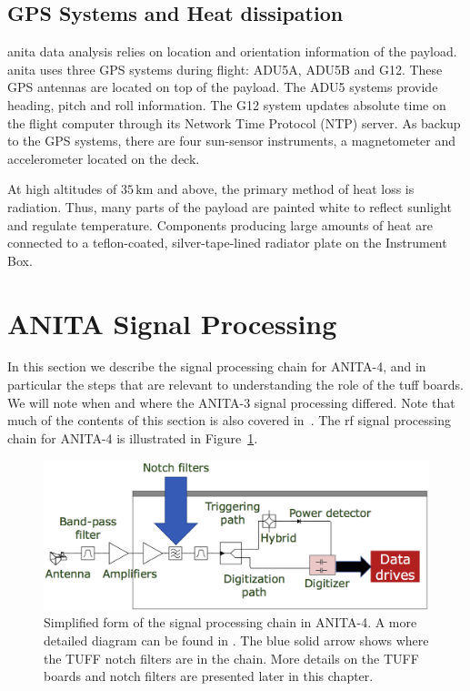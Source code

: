 \subsection{GPS Systems and Heat dissipation} 
\label{gps_heat}

\gls{anita} data analysis relies on location and orientation information of the payload. 
\gls{anita} uses three GPS systems during flight: ADU5A, ADU5B and G12. 
These GPS antennas are located on top of the payload.
The ADU5 systems provide heading, pitch and roll information.
The G12 system updates absolute time on the flight computer through its Network Time Protocol (NTP) server. 
As backup to the GPS systems, there are four sun-sensor instruments, a magnetometer and accelerometer located on the deck. 

At high altitudes of $35\,\mbox{km}$ and above, the primary method of heat loss is radiation. 
Thus, many parts of the payload are painted white to reflect sunlight and regulate temperature. 
Components producing large amounts of heat are connected to a teflon-coated, silver-tape-lined radiator plate on the Instrument Box.

\section{ANITA Signal Processing}

In this section we describe the signal processing chain for ANITA-4, and in particular
the steps that are relevant to understanding the role of the \gls{tuff} boards.
We will note when and where the ANITA-3 signal processing differed.
Note that much of the contents of this section is also covered in~\cite{tuff}. 
The \gls{rf} signal processing chain for ANITA-4 is illustrated in Figure~\ref{system}. 

\begin{figure}
\centering
\includegraphics[width=1.0\textwidth]{figures/A4_simple_system.png}
\caption{Simplified form of the signal processing chain in ANITA-4. A more detailed diagram can be found in \cite{tuff}. The blue solid arrow shows where the TUFF notch filters are in the chain. More details on the TUFF boards and notch filters are presented later in this chapter.}
\label{system}
\end{figure}

